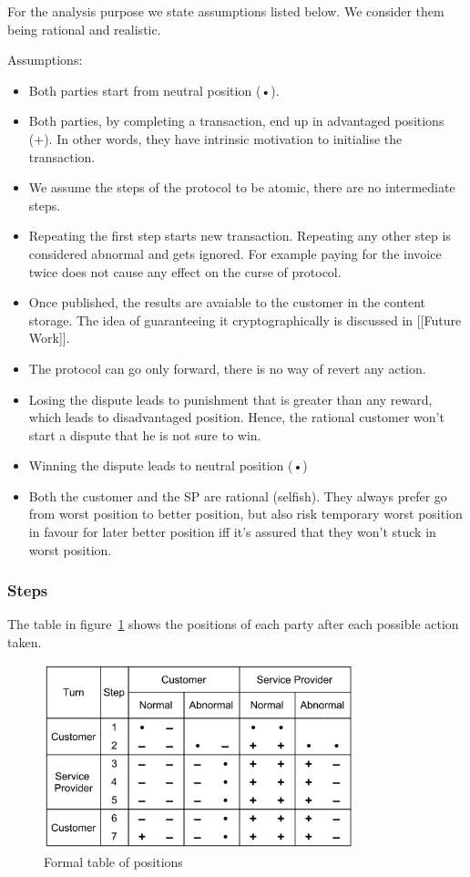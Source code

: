 \documentclass{ieeeaccess}
\begin{document}
For the analysis purpose we state assumptions listed below. We consider
them being rational and realistic.

Assumptions:

\begin{itemize}

\item
  Both parties start from neutral position (•).
\item
  Both parties, by completing a transaction, end up in advantaged
  positions (+). In other words, they have intrinsic motivation to
  initialise the transaction.
\item
  We assume the steps of the protocol to be atomic, there are no
  intermediate steps.
\item
  Repeating the first step starts new transaction. Repeating any other
  step is considered abnormal and gets ignored. For example paying for
  the invoice twice does not cause any effect on the curse of protocol.
\item
  Once published, the results are avaiable to the customer in the
  content storage. The idea of guaranteeing it cryptographically is
  discussed in {[}{[}Future Work{]}{]}.
\item
  The protocol can go only forward, there is no way of revert any
  action.
\item
  Losing the dispute leads to punishment that is greater than any
  reward, which leads to disadvantaged position. Hence, the rational
  customer won't start a dispute that he is not sure to win.
\item
  Winning the dispute leads to neutral position (•)
\item
  Both the customer and the SP are rational (selfish). They always
  prefer go from worst position to better position, but also risk
  temporary worst position in favour for later better position iff it's
  assured that they won't stuck in worst position.
\end{itemize}

\subsubsection{Steps}\label{steps}

The table in figure~\ref{fig:positions} shows the positions of each party after each possible
action taken.

\begin{figure}[h!]
\includegraphics[width=9cm]{formal-table-of-positions.png}
\centering
\caption{Formal table of positions}
\label{fig:positions}
\end{figure}
\end{document}
